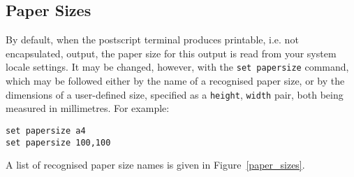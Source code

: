\documentclass[a4paper,onecolumn,11pt]{book}
\begin{document}
\subsection{Paper Sizes}

By default, when the postscript terminal produces printable, i.e. not
encapsulated, output, the paper size for this output is read from your system
locale settings. It may be changed, however, with the \texttt{set
papersize} command,
which may be followed either by the name of a recognised paper size, or by the
dimensions of a user-defined size, specified as a \texttt{height},
\texttt{width} pair, both being measured in millimetres. For example:

\begin{verbatim}
set papersize a4
set papersize 100,100
\end{verbatim}

A list of recognised paper size names is given in Figure~\ref{paper_sizes}.
\end{document}
